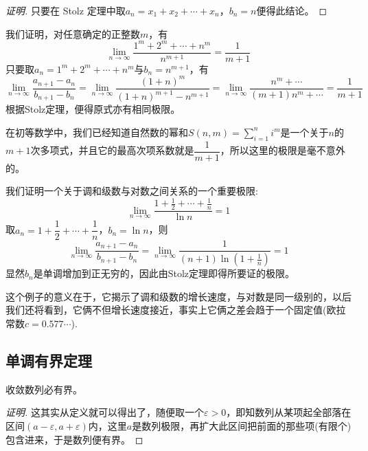 \begin{proof}[证明]
  只要在 Stolz 定理中取$a_n=x_1+x_2+\cdots+x_n$，$b_n=n$便得此结论。
\end{proof}

\begin{example}
  我们证明，对任意确定的正整数$m$，有
  \[ \lim_{n \to \infty} \frac{1^m+2^m+\cdots+n^m}{n^{m+1}} = \frac{1}{m+1} \]
  只要取$a_n=1^m+2^m+\cdots+n^m$与$b_n=n^{m+1}$，有
  \[ \lim_{n \to \infty} \frac{a_{n+1}-a_n}{b_{n+1}-b_n} = \lim_{n \to \infty} \frac{(1+n)^m}{(1+n)^{m+1}-n^{m+1}} = \lim_{n \to \infty} \frac{n^m+\cdots}{(m+1)n^m+\cdots} = \frac{1}{m+1} \]
  根据Stolz定理，便得原式亦有相同极限。

  在初等数学中，我们已经知道自然数的幂和$S(n,m)=\sum\limits_{i=1}^ni^m$是一个关于$n$的$m+1$次多项式，并且它的最高次项系数就是$\dfrac{1}{m+1}$，所以这里的极限是毫不意外的。
\end{example}

\begin{example}
  我们证明一个关于调和级数与对数之间关系的一个重要极限:
  \[ \lim_{n \to \infty} \frac{1+\frac{1}{2}+\cdots+\frac{1}{n}}{\ln{n}} = 1 \]
  取$a_n=1+\dfrac{1}{2}+\cdots+\dfrac{1}{n}$，$b_n=\ln{n}$，则
  \[ \lim_{n \to \infty} \frac{a_{n+1}-a_n}{b_{n+1}-b_n} = \lim_{n \to \infty} \frac{1}{(n+1)\ln{\left( 1+ \frac{1}{n} \right)}} = 1 \]
  显然$b_n$是单调增加到正无穷的，因此由Stolz定理即得所要证的极限。

  这个例子的意义在于，它揭示了调和级数的增长速度，与对数是同一级别的，以后我们还将看到，它俩不但增长速度接近，事实上它俩之差会趋于一个固定值(欧拉常数$c=0.577\cdots$).
\end{example}


\subsection{单调有界定理}
\label{sec:theorem-of-monotone-bounded}

\begin{theorem}[收敛数列的有界性]
  收敛数列必有界。
\end{theorem}

\begin{proof}[证明]
  这其实从定义就可以得出了，随便取一个$\varepsilon>0$，即知数列从某项起全部落在区间$(a-\varepsilon, a+\varepsilon)$内，这里$a$是数列极限，再扩大此区间把前面的那些项(有限个)包含进来，于是数列便有界。
\end{proof}

